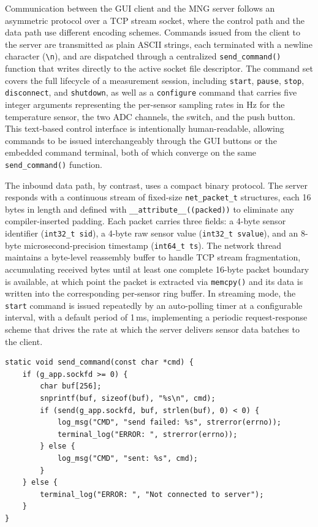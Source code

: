 Communication between the GUI client and the MNG server follows an asymmetric
protocol over a TCP stream socket, where the control path and the data path use
different encoding schemes. Commands issued from the client to the server are
transmitted as plain ASCII strings, each terminated with a newline character
(\texttt{\textbackslash n}), and are dispatched through a centralized
\texttt{send\_command()} function that writes directly to the active socket file
descriptor. The command set covers the full lifecycle of a measurement session,
including \texttt{start}, \texttt{pause}, \texttt{stop}, \texttt{disconnect}, and
\texttt{shutdown}, as well as a \texttt{configure} command that carries five integer
arguments representing the per-sensor sampling rates in Hz for the temperature
sensor, the two ADC channels, the switch, and the push button. This text-based
control interface is intentionally human-readable, allowing commands to be issued
interchangeably through the GUI buttons or the embedded command terminal, both of
which converge on the same \texttt{send\_command()} function.

The inbound data path, by contrast, uses a compact binary protocol. The server
responds with a continuous stream of fixed-size \texttt{net\_packet\_t} structures,
each 16 bytes in length and defined with \texttt{\_\_attribute\_\_((packed))} to
eliminate any compiler-inserted padding. Each packet carries three fields: a 4-byte
sensor identifier (\texttt{int32\_t sid}), a 4-byte raw sensor value
(\texttt{int32\_t svalue}), and an 8-byte microsecond-precision timestamp
(\texttt{int64\_t ts}). The network thread maintains a byte-level reassembly buffer
to handle TCP stream fragmentation, accumulating received bytes until at least one
complete 16-byte packet boundary is available, at which point the packet is extracted
via \texttt{memcpy()} and its data is written into the corresponding per-sensor ring
buffer. In streaming mode, the \texttt{start} command is issued repeatedly by an
auto-polling timer at a configurable interval, with a default period of \mbox{1\,ms},
implementing a periodic request-response scheme that drives the rate at which the
server delivers sensor data batches to the client.

\begin{verbatim}
static void send_command(const char *cmd) {
    if (g_app.sockfd >= 0) {
        char buf[256];
        snprintf(buf, sizeof(buf), "%s\n", cmd);
        if (send(g_app.sockfd, buf, strlen(buf), 0) < 0) {
            log_msg("CMD", "send failed: %s", strerror(errno));
            terminal_log("ERROR: ", strerror(errno));
        } else {
            log_msg("CMD", "sent: %s", cmd);
        }
    } else {
        terminal_log("ERROR: ", "Not connected to server");
    }
}
\end{verbatim}

